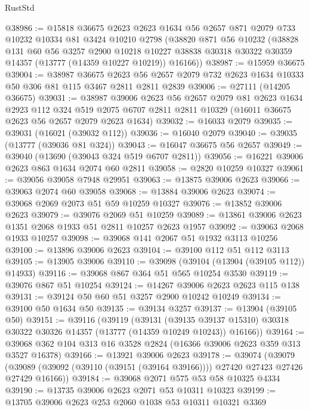 \begin{lexlean}{RustStd}
\begin{coremodule}
@38986 := @15818
    @36675
    @2623
    @2623
    @1634
    @56
    @2657
    @871
    @2079
    @733
    @10232
    @10334
    @81
    @3424
    @10210
    @2798
    (@38820
      @871
      @56
      @10232
      (@38828
        @131
        @60
        @56
        @3257
        @2900
        @10218
        @10227
        @38838
        @30318
        @30322
        @30359
        @14357
        (@13777 (@14359 @10227 @10219))
        @16166))
@38987 := @15959 @36675
@39004 := @38987
    @36675
    @2623
    @56
    @2657
    @2079
    @732
    @2623
    @1634
    @10333
    @50
    @306
    @81
    @115
    @3467
    @2811
    @2811
    @2839
@39006 := @27111 (@14205 @36675)
@39031 := @38987
    @39006
    @2623
    @56
    @2657
    @2079
    @81
    @2623
    @1634
    @2923
    @112
    @324
    @519
    @2075
    @6707
    @2811
    @2811
    @10329
    (@16011 @36675 @2623 @56 @2657 @2079 @2623 @1634)
@39032 := @16033 @2079
@39035 := @39031 (@16021 (@39032 @112))
@39036 := @16040 @2079
@39040 := @39035 (@13777 (@39036 @81 @324))
@39043 := @16047 @36675 @56 @2657
@39049 := @39040 (@13690 (@39043 @324 @519 @6707 @2811))
@39056 := @16221 @39006 @2623 @863 @1634 @2074 @60 @2811
@39058 := @2820 @10259 @10327
@39061 := @39056 @39058 @7948 @29951
@39063 := @13875 @39006 @2623
@39066 := @39063 @2074 @60 @39058
@39068 := @13884 @39006 @2623
@39074 := @39068 @2069 @2073 @51 @59 @10259 @10327
@39076 := @13852 @39006 @2623
@39079 := @39076 @2069 @51 @10259
@39089 := @13861 @39006 @2623 @1351 @2068 @1933 @51 @2811 @10257 @2623 @1957
@39092 := @39063 @2068 @1933 @10257
@39098 := @39068 @141 @2067 @51 @1932 @3113 @10256
@39100 := @13896 @39006 @2623
@39104 := @39100 @112 @51 @112 @3113
@39105 := @13905 @39006
@39110 := @39098 (@39104 (@13904 (@39105 @112)) @14933)
@39116 := @39068 @867 @364 @51 @565 @10254 @3530
@39119 := @39076 @867 @51 @10254
@39124 := @14267 @39006 @2623 @2623 @115 @138
@39131 := @39124 @50 @60 @51 @3257 @2900 @10242 @10249
@39134 := @39100 @50 @1634 @50
@39135 := @39134 @3257
@39137 := @13904 (@39105 @50)
@39151 := @39116
    (@39119
      (@39131
        (@39135 @39137 @15310)
        @30318
        @30322
        @30326
        @14357
        (@13777 (@14359 @10249 @10243))
        @16166))
@39164 := @39068 @362 @104 @313 @16 @3528 @2824 (@16366 @39006 @2623 @359 @313 @3527 @16378)
@39166 := @13921 @39006 @2623
@39178 := @39074
    (@39079 (@39089 (@39092 (@39110 (@39151 (@39164 @39166)))) @27420 @27423 @27426 @27429 @16166))
@39184 := @39068 @2071 @575 @53 @58 @10325 @4334
@39190 := @13735 @39006 @2623 @2071 @53 @10311 @10323
@39199 := @13705 @39006 @2623 @253 @2060 @1038 @53 @10311 @10321 @3369

\end{coremodule}
\end{lexlean}
